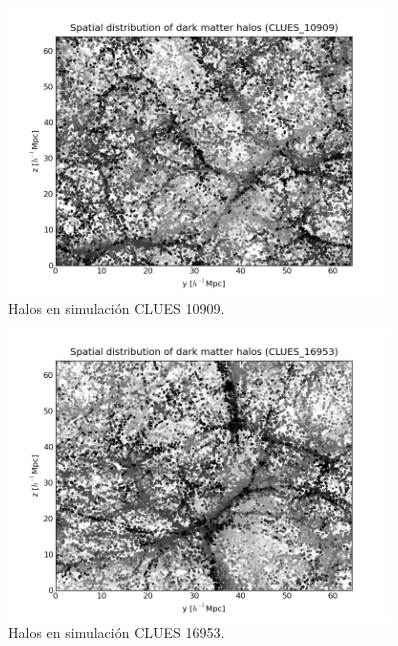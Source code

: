 \begin{figure}[htbp]
	\centering
	\includegraphics[width=0.9\textwidth]
	{./figures/3_nbody_simulations/Halos_Spatial_Distribution(CLUES_10909).png}
	
	\caption{\small{Halos en simulación CLUES 10909.}}
	
	\label{fig:CurvedSpaces}
\end{figure}


\begin{figure}[htbp]
	\centering
	\includegraphics[width=0.9\textwidth]
	{./figures/3_nbody_simulations/Halos_Spatial_Distribution(CLUES_16953).png}
	
	\caption{\small{Halos en simulación CLUES 16953.}}
	
	\label{fig:CurvedSpaces}
\end{figure}


